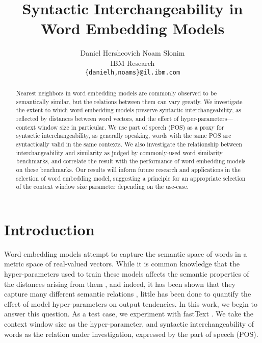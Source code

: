 \documentclass[11pt,a4paper]{article}
\title{Syntactic Interchangeability in Word Embedding Models}
\author{
Daniel Hershcovich \qquad Noam Slonim \\
IBM Research\\
\texttt{\{danielh,noams\}@il.ibm.com}
}
\begin{document}
    \maketitle

    \begin{abstract}
    Nearest neighbors in word embedding models are commonly observed to be
    semantically similar, but the relations between them can vary greatly.
    We investigate the extent to which word embedding models
    preserve syntactic interchangeability, as reflected by distances between
    word vectors, and the effect of hyper-parameters---context window size in particular.
    We use part of speech (POS) as a proxy for syntactic interchangeability,
    as generally speaking, words with the same POS are syntactically valid in the same contexts.
    We also investigate the relationship between interchangeability
    and similarity as judged by commonly-used word similarity benchmarks,
    and correlate the result with the performance of word embedding models
    on these benchmarks.
    Our results will inform future research and applications in the selection
    of word embedding model, suggesting a principle for an appropriate selection
    of the context window size parameter depending on the use-case.
    \end{abstract}

    \section{Introduction}\label{sec:introduction}

    Word embedding models \cite{mikolov2013efficient,pennington2014glove,levy2015improving}
    attempt to capture the semantic space of words
    in a metric space of real-valued vectors.
    While it is common knowledge that the hyper-parameters used to train these
    models affects the semantic properties of the distances arising from them
    \cite{goldberg2016primer}, and indeed, it has been shown that
    they capture many different semantic relations \cite{yang2006verb,agirre2009study},
    little has been done to quantify the
    effect of model hyper-parameters on output tendencies.
    In this work, we begin to answer this question.
    As a test case, we experiment with fastText \cite{bojanowski2016enriching}.
    We take the context window size as the hyper-parameter,
    and syntactic interchangeability of words as the relation under investigation,
    expressed by the part of speech (POS).
    
\end{document}
